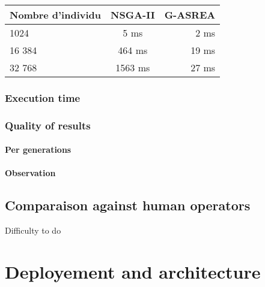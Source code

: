\documentclass[12pt]{memoir}
\begin{document}
\begin{center}
	\begin{tabular}{ |l| c| r| }
		\hline
		Nombre d'individu & NSGA-II & G-ASREA \\
		\hline
		1024 & 5 ms & 2 ms \\
		16 384 & 464 ms & 19 ms\\
		32 768  & 1563 ms& 27 ms\\
		\hline
	\end{tabular}
\end{center}

\subsubsection{Execution time}
\subsubsection{Quality of results}

\paragraph{Per generations}

\paragraph{Observation}

\subsection{Comparaison against human operators}
Difficulty to do 

\section{Deployement and architecture}
\end{document}
